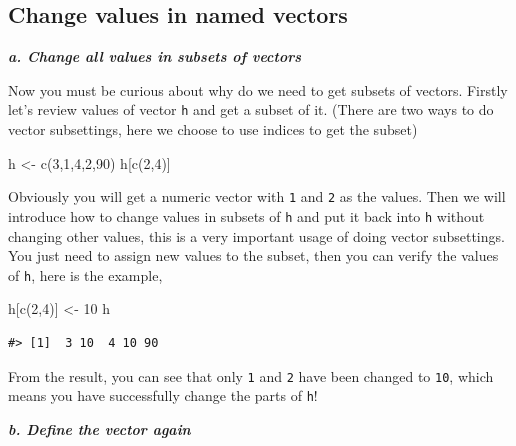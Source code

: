 \documentclass[
]{book}
\newenvironment{Shaded}{\begin{snugshade}}{\end{snugshade}}
\newcommand{\DecValTok}[1]{\textcolor[rgb]{0.00,0.00,0.81}{#1}}
\newcommand{\FunctionTok}[1]{\textcolor[rgb]{0.00,0.00,0.00}{#1}}
\newcommand{\NormalTok}[1]{#1}
\newcommand{\OtherTok}[1]{\textcolor[rgb]{0.56,0.35,0.01}{#1}}
\begin{document}
\hypertarget{change-values-in-named-vectors}{%
\subsection{Change values in named vectors}\label{change-values-in-named-vectors}}

\textbf{\emph{a. Change all values in subsets of vectors}}

Now you must be curious about why do we need to get subsets of vectors. Firstly let's review values of vector \texttt{h} and get a subset of it. (There are two ways to do vector subsettings, here we choose to use indices to get the subset)

\begin{Shaded}
\begin{Highlighting}[]
\NormalTok{h }\OtherTok{\textless{}{-}} \FunctionTok{c}\NormalTok{(}\DecValTok{3}\NormalTok{,}\DecValTok{1}\NormalTok{,}\DecValTok{4}\NormalTok{,}\DecValTok{2}\NormalTok{,}\DecValTok{90}\NormalTok{)}
\NormalTok{h[}\FunctionTok{c}\NormalTok{(}\DecValTok{2}\NormalTok{,}\DecValTok{4}\NormalTok{)]}
\end{Highlighting}
\end{Shaded}

Obviously you will get a numeric vector with \texttt{1} and \texttt{2} as the values. Then we will introduce how to change values in subsets of \texttt{h} and put it back into \texttt{h} without changing other values, this is a very important usage of doing vector subsettings. You just need to assign new values to the subset, then you can verify the values of \texttt{h}, here is the example,

\begin{Shaded}
\begin{Highlighting}[]
\NormalTok{h[}\FunctionTok{c}\NormalTok{(}\DecValTok{2}\NormalTok{,}\DecValTok{4}\NormalTok{)] }\OtherTok{\textless{}{-}} \DecValTok{10}
\NormalTok{h}
\end{Highlighting}
\end{Shaded}

\begin{verbatim}
#> [1]  3 10  4 10 90
\end{verbatim}

From the result, you can see that only \texttt{1} and \texttt{2} have been changed to \texttt{10}, which means you have successfully change the parts of \texttt{h}!

\textbf{\emph{b. Define the vector again}}
\end{document}
